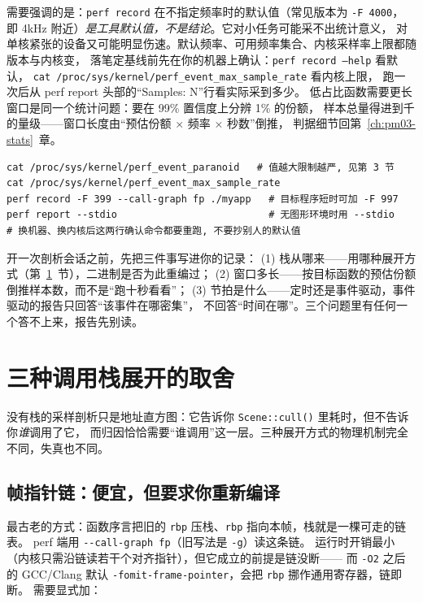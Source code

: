 \documentclass[12pt,a4paper,fontset=fandol]{ctexbook}
\newcommand{\Fn}[1]{\texttt{#1()}}
\newcommand{\Tp}[1]{\texttt{#1}}
\newcommand{\Opt}[1]{\texttt{-\/-#1}}
\newcommand{\Bk}{\discretionary{}{}{}}
\begin{document}
需要强调的是：\Tp{perf record} 在不指定频率时的默认值（常见版本为 \Tp{-F 4000}，
即 4kHz 附近）\emph{是工具默认值，不是结论}。它对小任务可能采不出统计意义，
对单核紧张的设备又可能明显伤速。默认频率、可用频率集合、内核采样率上限都随版本与内核变，
落笔定基线前先在你的机器上确认：\Tp{perf record --help} 看默认，
\Tp{cat /proc/sys/kernel/perf{\Bk}\_event{\Bk}\_max{\Bk}\_sample{\Bk}\_rate} 看内核上限，
跑一次后从 perf report 头部的``Samples: N''行看实际采到多少。
低占比函数需要更长窗口是同一个统计问题：要在 99\% 置信度上分辨 1\% 的份额，
样本总量得进到千的量级——窗口长度由``预估份额 $\times$ 频率 $\times$ 秒数''倒推，
判据细节回第~\ref{ch:pm03-stats}~章。

\begin{lstlisting}[style=shellstyle, caption={最小可用的一次采样会话：先确认权限与上限，再记录，再看。}, label={lst:pm04-first}]
cat /proc/sys/kernel/perf_event_paranoid   # 值越大限制越严, 见第 3 节
cat /proc/sys/kernel/perf_event_max_sample_rate
perf record -F 399 --call-graph fp ./myapp   # 目标程序短时可加 -F 997
perf report --stdio                          # 无图形环境时用 --stdio
# 换机器、换内核后这两行确认命令都要重跑, 不要抄别人的默认值
\end{lstlisting}

\begin{guideline}[title={开工前三个问题}]
开一次剖析会话之前，先把三件事写进你的记录：
(1) 栈从哪来——用哪种展开方式（第~\ref{sec:pm04-unwind}~节），二进制是否为此重编过；
(2) 窗口多长——按目标函数的预估份额倒推样本数，而不是``跑十秒看看''；
(3) 节拍是什么——定时还是事件驱动，事件驱动的报告只回答``该事件在哪密集''，
不回答``时间在哪''。三个问题里有任何一个答不上来，报告先别读。
\end{guideline}

\section{三种调用栈展开的取舍}
\label{sec:pm04-unwind}

没有栈的采样剖析只是地址直方图：它告诉你 \Fn{Scene::cull} 里耗时，但不告诉你\emph{谁}调用了它，
而归因恰恰需要``谁调用''这一层。三种展开方式的物理机制完全不同，失真也不同。

\subsection{帧指针链：便宜，但要求你重新编译}

最古老的方式：函数序言把旧的 \Tp{rbp} 压栈、\Tp{rbp} 指向本帧，栈就是一棵可走的链表。
perf 端用 \Opt{call-graph fp}（旧写法是 \Tp{-g}）读这条链。
运行时开销最小（内核只需沿链读若干个对齐指针），但它成立的前提是链没断——
而 \Tp{-O2} 之后的 GCC/Clang 默认 \Tp{-fomit-frame-pointer}，会把 \Tp{rbp} 挪作通用寄存器，链即断。
需要显式加：
\end{document}
